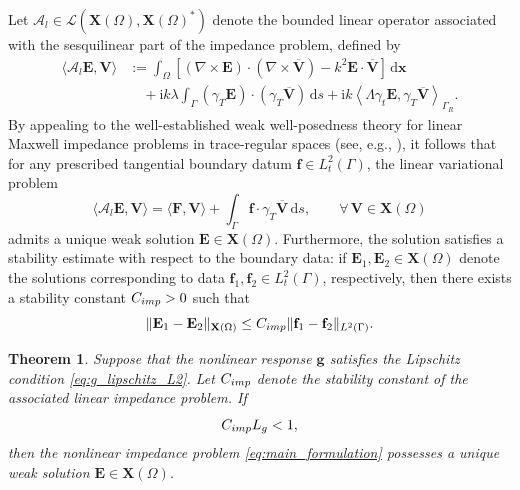 \documentclass[10pt,a4paper]{amsart}
\newtheorem{theo}{Theorem}[section]
\numberwithin{equation}{section}
\begin{document}
Let $\mathscr {A}_l \in \mathcal{L}(\mathbf{X}(\Omega), \mathbf{X}(\Omega)^*)$ denote the bounded linear operator associated with the sesquilinear part of the impedance problem, defined by
\begin{equation}
\label{eq:Al_definition}
\begin{aligned}
\langle \mathscr {A}_l \mathbf{E}, \mathbf{V} \rangle 
&:= \int_\Omega \left[ (\nabla \times \mathbf{E}) \cdot (\nabla \times \overline{\mathbf{V}}) - k^2 \mathbf{E} \cdot \overline{\mathbf{V}} \right] \, \mathrm{d}\boldsymbol {x} \\
&\quad + \mathrm{i} k \lambda \int_\Gamma (\gamma_T \mathbf{E}) \cdot (\gamma_T \overline{\mathbf{V}}) \, \mathrm{d}s + \mathrm{i} k \left\langle \Lambda \gamma_t \mathbf{E}, \gamma_T \overline{\mathbf{V}} \right\rangle_{\Gamma_R}.
\end{aligned}
\end{equation}
By appealing to the well-established weak well-posedness theory for linear Maxwell impedance problems in trace-regular spaces (see, e.g., \cite[Theorem 4.17]{Monk2003}), it follows that for any prescribed tangential boundary datum $\mathbf{f} \in L_t^2(\Gamma)$, the linear variational problem
\begin{equation}
\label{eq:linear_impedance_data_problem}
\langle \mathscr {A}_l \mathbf{E}, \mathbf{V} \rangle = \langle \mathbf{F}, \mathbf{V} \rangle + \int_\Gamma \mathbf{f} \cdot \gamma_T \overline{\mathbf{V}} \, \mathrm{d}s, \qquad \forall \, \mathbf{V} \in \mathbf{X}(\Omega)
\end{equation}
admits a unique weak solution $\mathbf{E} \in \mathbf{X}(\Omega)$. Furthermore, the solution satisfies a stability estimate with respect to the boundary data: if $\mathbf{E}_1, \mathbf{E}_2 \in \mathbf{X}(\Omega)$ denote the solutions corresponding to data $\mathbf{f}_1, \mathbf{f}_2 \in L_t^2(\Gamma)$, respectively, then there exists a stability constant $C_{\rm imp} > 0$ such that
\begin{equation}
\label{eq:linear_stability}
\|\mathbf{E}_1 - \mathbf{E}_2\|_{\mathbf{X}(\Omega)} \le C_{\rm imp} \|\mathbf{f}_1 - \mathbf{f}_2\|_{L^2(\Gamma)}.
\end{equation}


\begin{theo}
\label{th:existence_nibc}
Suppose that the nonlinear response $\mathbf{g}$ satisfies the Lipschitz condition \eqref{eq:g_lipschitz_L2}. Let $C_{\rm imp}$ denote the stability constant of the associated linear impedance problem. If 
\[
C_{\rm imp} L_g < 1,
\]
then the nonlinear impedance problem \eqref{eq:main_formulation} possesses a unique weak solution $\mathbf{E} \in \mathbf{X}(\Omega)$.
\end{theo}
\end{document}
